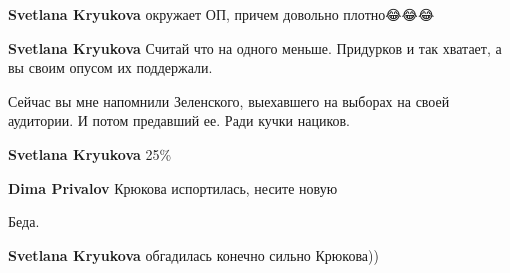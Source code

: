 \begin{itemize}
\begin{itemize}
\textbf{Svetlana Kryukova} окружает ОП, причем довольно плотно😂😂😂

 
\textbf{Svetlana Kryukova} Считай что на одного меньше. Придурков и так хватает, а вы своим опусом их поддержали.

 
Сейчас вы мне напомнили Зеленского, выехавшего на выборах на своей аудитории. И потом предавший ее. Ради кучки нациков.

 
\textbf{Svetlana Kryukova} 25\%

 
\textbf{Dima Privalov} Крюкова испортилась, несите новую

 
Беда.

 
\textbf{Svetlana Kryukova} обгадилась конечно сильно Крюкова))

 

\end{itemize}
\end{itemize}
